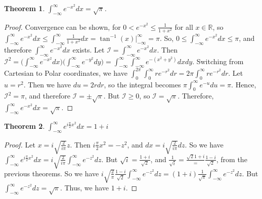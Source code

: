 \documentclass{article}
\theoremstyle{mystyle}
\newtheorem{theorem}{Theorem}[section]
\begin{document}
\begin{theorem}
$\int_{-\infty}^{\infty}e^{-x^2}dx = \sqrt{\pi}$.
\end{theorem}
\begin{proof}
Convergence can be shown, for $0 < e^{-x^2} \leq \frac{1}{1+x^2}$ for all $x\in \mathbb{R}$, so $\int_{-\infty}^{\infty} e^{-x^2}dx \leq \int_{-\infty}^{\infty} \frac{1}{1+x^2}dx = \tan^{-1}(x)\big|_{-\infty}^{\infty} = \pi$. So, $0 \leq \int_{-\infty}^{\infty} e^{-x^2} dx \leq \pi$, and therefore $\int_{-\infty}^{\infty}e^{-x^2}dx$ exists. Let $\mathcal{I} = \int_{-\infty}^{\infty} e^{-x^2}dx$. Then $\mathcal{I}^2 = \bigg(\int_{-\infty}^{\infty}e^{-x^2}dx\bigg)\bigg(\int_{-\infty}^{\infty}e^{-y^2}dy\bigg) = \int_{-\infty}^{\infty}\int_{-\infty}^{\infty}e^{-(x^2+y^2)}dxdy$. Switching from Cartesian to Polar coordinates, we have $\int_{0}^{2\pi}\int_{0}^{\infty} re^{-r^2}dr = 2\pi \int_{0}^{\infty}re^{-r^2}dr$. Let $u = r^2$. Then we have $du = 2rdr$, so the integral becomes $\pi \int_{0}^{\infty} e^{-u}du = \pi$. Hence, $\mathcal{I}^2 = \pi$, and therefore $\mathcal{I} = \pm \sqrt{\pi}$. But $\mathcal{I} \geq 0$, so $\mathcal{I} = \sqrt{\pi}$. Therefore, $\int_{-\infty}^{\infty}e^{-x^2}dx = \sqrt{\pi}$. 
\end{proof}

\begin{theorem}
$\int_{-\infty}^{\infty} e^{i\frac{\pi}{2}x^2}dx = 1+i$
\end{theorem}
\begin{proof}
Let $x = i\sqrt{\frac{2}{i\pi}}z$. Then $i\frac{\pi}{2}x^2 = -z^2$, and $dx = i\sqrt{\frac{2}{i\pi}}dz$. So we have $\int_{-\infty}^{\infty}e^{i\frac{\pi}{2}x^2}dx = i\sqrt{\frac{2}{i\pi}}\int_{-\infty}^{\infty} e^{-z^2}dz$. But $\sqrt{i} = \frac{1+i}{\sqrt{2}}$, and $\frac{1}{\sqrt{i}} = \frac{\sqrt{2}{1+i}} = \frac{1-i}{\sqrt{2}}$, from the previous theorems. So we have $i\sqrt{\frac{2}{\pi}}\frac{1-i}{\sqrt{2}}\int_{-\infty}^{\infty}e^{-z^2}dz = (1+i)\frac{1}{\sqrt{\pi}}\int_{-\infty}^{\infty}e^{-z^2}dz$. But $\int_{-\infty}^{\infty}e^{-z^2}dz = \sqrt{\pi}$. Thus, we have $1+i$.
\end{proof}
\end{document}

